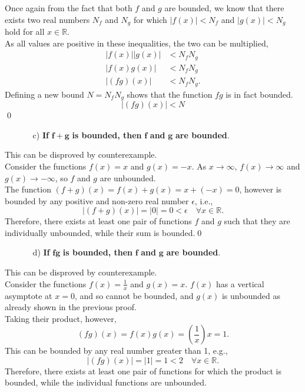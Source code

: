 \documentclass{amsart}
\begin{document}
Once again from the fact that both $f$ and $g$ are bounded, we know that there exists two real numbers $N_{f}$ and $N_{g}$ for which $|f(x)|<N_{f}$ and $|g(x)|<N_{g}$ hold for all $x\in \mathbb{R}$.\\
As all values are positive in these inequalities, the two can be multiplied,
\begin{align*}
|f(x)||g(x)| &< N_{f}N_{g}\\
|f(x)g(x)| &< N_{f}N_{g}\\
|(fg)(x)| &< N_{f}N_{g}.
\end{align*}
Defining a new bound $N = N_{f}N_{g}$ shows that the function $fg$ is in fact bounded.
$$
|(fg)(x)| < N
$$
\qed
\\

\begin{enumerate}
    \item []
    \begin{itemize}
        \item [c)] \textbf{If }$\mathbf{f+g}$\textbf{ is bounded, then }$\mathbf{f}$\textbf{ and }$\mathbf{g}$\textbf{ are bounded}.
    \end{itemize}
\end{enumerate}

This can be disproved by counterexample.\\
Consider the functions $f(x) = x$ and $g(x) = -x$. As $x\longrightarrow \infty$, $f(x)\longrightarrow\infty$ and $g(x)\longrightarrow -\infty$, so $f$ and $g$ are unbounded.\\
The function $(f+g)(x) = f(x)+g(x) = x + (-x) = 0$, however is bounded by any positive and non-zero real number $\epsilon$, i.e.,
$$
|(f+g)(x)| = |0| = 0 < \epsilon\quad \forall x\in\mathbb{R}.
$$
Therefore, there exists at least one pair of functions $f$ and $g$ such that they are individually unbounded, while their sum is bounded.\qed
\\

\begin{enumerate}
    \item []
    \begin{itemize}
        \item [d)] \textbf{If }$\mathbf{fg}$\textbf{ is bounded, then }$\mathbf{f}$\textbf{ and }$\mathbf{g}$\textbf{ are bounded}.
    \end{itemize}
\end{enumerate}

This can be disproved by counterexample.\\
Consider the functions $f(x) = \frac{1}{x}$ and $g(x) = x$. $f(x)$ has a vertical asymptote at $x=0$, and so cannot be bounded, and $g(x)$ is unbounded as already shown in the previous proof.\\
Taking their product, however,
$$
(fg)(x) = f(x)g(x) = \left(\frac{1}{x}\right)x = 1.
$$
This can be bounded by any real number greater than 1, e.g.,
$$
|(fg)(x)| = |1| = 1 < 2\quad\forall x\in\mathbb{R}.
$$
Therefore, there exists at least one pair of functions for which the product is bounded, while the individual functions are unbounded.
\\
\end{document}
